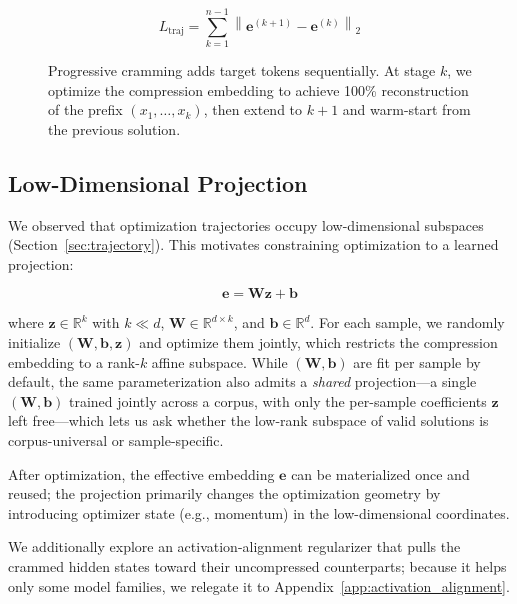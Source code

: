 \documentclass{article}
\theoremstyle{plain}
\theoremstyle{definition}
\theoremstyle{remark}
\begin{document}
\begin{equation}
    L_{\text{traj}} = \sum_{k=1}^{n-1} \left\| \mathbf{e}^{(k+1)} - \mathbf{e}^{(k)} \right\|_2
\end{equation}



\begin{figure}[t]
    \centering
    
    \caption{Progressive cramming adds target tokens sequentially. At stage $k$, we optimize the compression embedding to achieve 100\% reconstruction of the prefix $(x_1,\ldots,x_k)$, then extend to $k{+}1$ and warm-start from the previous solution.}
    \label{fig:progressive}
\end{figure}

\subsection{Low-Dimensional Projection}
\label{sec:lowdim}

We observed that optimization trajectories occupy low-dimensional subspaces (Section~\ref{sec:trajectory}).
This motivates constraining optimization to a learned projection:

\begin{equation}
    \mathbf{e} = \mathbf{W} \mathbf{z} + \mathbf{b}
\end{equation}

where $\mathbf{z} \in \mathbb{R}^k$ with $k \ll d$, $\mathbf{W} \in \mathbb{R}^{d \times k}$, and $\mathbf{b} \in \mathbb{R}^d$.
For each sample, we randomly initialize $(\mathbf{W}, \mathbf{b}, \mathbf{z})$ and optimize them jointly, which restricts the compression embedding to a rank-$k$ affine subspace.
While $(\mathbf{W}, \mathbf{b})$ are fit per sample by default, the same parameterization also admits a \emph{shared} projection---a single $(\mathbf{W}, \mathbf{b})$ trained jointly across a corpus, with only the per-sample coefficients $\mathbf{z}$ left free---which lets us ask whether the low-rank subspace of valid solutions is corpus-universal or sample-specific.

After optimization, the effective embedding $\mathbf{e}$ can be materialized once and reused; the projection primarily changes the optimization geometry by introducing optimizer state (e.g., momentum) in the low-dimensional coordinates.

We additionally explore an activation-alignment regularizer that pulls the crammed hidden states toward their uncompressed counterparts; because it helps only some model families, we relegate it to Appendix~\ref{app:activation_alignment}.
\end{document}

